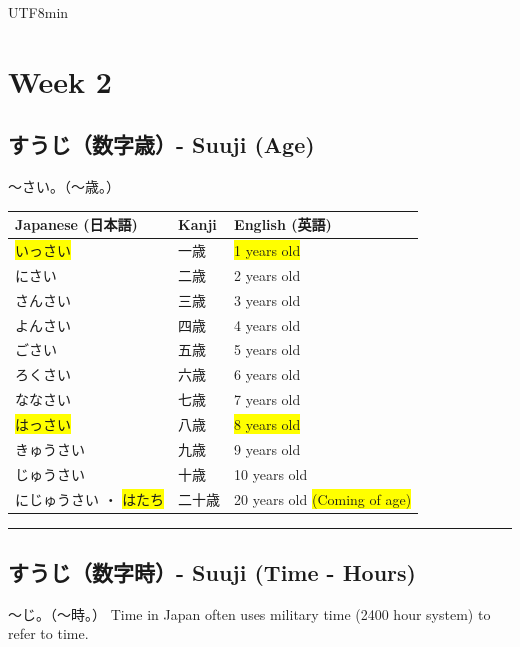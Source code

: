 \documentclass[11pt]{article}
\begin{document}
\begin{CJK}{UTF8}{min}
\newpage
\section{Week 2}

\subsection{すうじ（数字歳）- Suuji (Age)}
〜さい。（〜歳。）
\vspace{5pt}

\begin{tabularx}{\textwidth}{X | X | X}
    \toprule
    \textbf{Japanese (日本語)} & \textbf{Kanji} & \textbf{English (英語)} \\
    \midrule
    \colorbox{yellow}{いっさい} & 一歳 & \colorbox{yellow}{1 years old} \\
    にさい & 二歳 & 2 years old \\
    さんさい & 三歳 & 3 years old \\
    よんさい & 四歳 & 4 years old \\
    ごさい & 五歳 & 5 years old \\
    ろくさい & 六歳 & 6 years old \\
    ななさい & 七歳 & 7 years old \\
    \colorbox{yellow}{はっさい} & 八歳 & \colorbox{yellow}{8 years old} \\
    きゅうさい & 九歳 & 9 years old \\
    じゅうさい & 十歳 & 10 years old \\
    にじゅうさい ・ \colorbox{yellow}{はたち} & 二十歳 & 20 years old \colorbox{yellow}{(Coming of age)} \\
\end{tabularx}
\noindent\rule{\linewidth}{1pt}

\subsection{すうじ（数字時）- Suuji (Time - Hours)}
〜じ。（〜時。）
Time in Japan often uses military time (2400 hour system) to refer to time.
\vspace{5pt}


\end{CJK}
\end{document}
